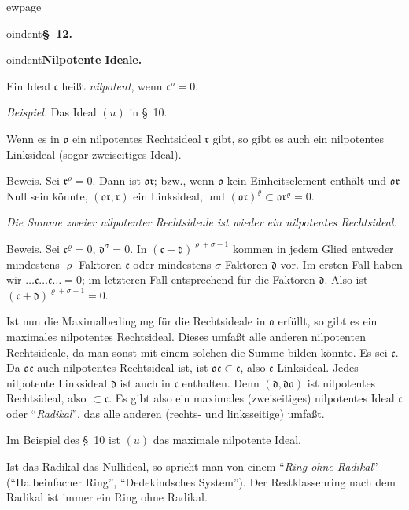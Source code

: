 \documentclass[12pt,a4paper]{article}
\newcommand{\idealc}{\mathfrak{c}}
\theoremstyle{definition}
\begin{document}
ewpage
\setcounter{page}{599}



oindent\textbf{\S~12.}



oindent\textbf{Nilpotente Ideale.}

Ein Ideal $\idealc$ hei\ss t \textit{nilpotent}, wenn $\idealc^\rho = 0$.

\textit{Beispiel.} Das Ideal $(u)$ in \S~10.

Wenn es in $\mathfrak{o}$ ein nilpotentes Rechtsideal $\mathfrak{r}$ gibt,
so gibt es auch ein nilpotentes Linksideal (sogar zweiseitiges Ideal).

Beweis. Sei $\mathfrak{r}^\varrho = 0$. Dann ist
$\mathfrak{o}\mathfrak{r}$; bzw., wenn $\mathfrak{o}$ kein Einheitselement
enth\"alt und $\mathfrak{o}\mathfrak{r}$ Null sein k\"onnte,
$(\mathfrak{o}\mathfrak{r}, \mathfrak{r})$ ein Linksideal, und
$(\mathfrak{o}\mathfrak{r})^\varrho \subset
\mathfrak{o}\mathfrak{r}^\varrho = 0$.

\textit{Die Summe zweier nilpotenter Rechtsideale ist wieder ein
nilpotentes Rechtsideal.}

Beweis. Sei $\mathfrak{c}^\varrho = 0$, $\mathfrak{d}^\sigma = 0$. In
$(\mathfrak{c} + \mathfrak{d})^{\varrho+\sigma-1}$ kommen in jedem Glied
entweder mindestens $\varrho$ Faktoren $\mathfrak{c}$ oder mindestens
$\sigma$ Faktoren $\mathfrak{d}$ vor. Im ersten Fall haben wir
$\dots \mathfrak{c} \dots \mathfrak{c} \dots = 0$; im letzteren Fall
entsprechend f\"ur die Faktoren $\mathfrak{d}$. Also ist
$(\mathfrak{c} + \mathfrak{d})^{\varrho+\sigma-1} = 0$.

Ist nun die Maximalbedingung f\"ur die Rechtsideale in $\mathfrak{o}$
erf\"ullt, so gibt es ein maximales nilpotentes Rechtsideal. Dieses
umfa\ss t alle anderen nilpotenten Rechtsideale, da man sonst mit einem
solchen die Summe bilden k\"onnte. Es sei $\mathfrak{c}$. Da
$\mathfrak{o}\mathfrak{c}$ auch nilpotentes Rechtsideal ist, ist
$\mathfrak{o}\mathfrak{c} \subset \mathfrak{c}$, also $\mathfrak{c}$
Linksideal. Jedes nilpotente Linksideal $\mathfrak{d}$ ist auch in
$\mathfrak{c}$ enthalten. Denn $(\mathfrak{d}, \mathfrak{d}\mathfrak{o})$
ist nilpotentes Rechtsideal, also $\subset \mathfrak{c}$. Es gibt also
ein maximales (zweiseitiges) nilpotentes Ideal $\mathfrak{c}$ oder
``\textit{Radikal}'', das alle anderen (rechts- und linksseitige) umfa\ss t.

Im Beispiel des \S~10 ist $(u)$ das maximale nilpotente Ideal.

Ist das Radikal das Nullideal, so spricht man von einem ``\textit{Ring
ohne Radikal}'' (``Halbeinfacher Ring'', ``Dedekindsches System''). Der
Restklassenring nach dem Radikal ist immer ein Ring ohne Radikal.
\end{document}
